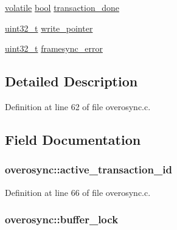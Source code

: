 \begin{DoxyCompactItemize}
\item 
\hyperlink{group___c_m_s_i_s___core___instruction_interface_gad7d93af13046b0378601b85c8c16673b}{volatile} \hyperlink{group___exported__types_gaf6a258d8f3ee5206d682d799316314b1}{bool} \hyperlink{structoverosync_a065e182f37469dcd89b3de4464d91267}{transaction\-\_\-done}
\item 
\hyperlink{stdint_8h_a435d1572bf3f880d55459d9805097f62}{uint32\-\_\-t} \hyperlink{structoverosync_a094836cef0f9cc8e8b45f8d6a58dc9ad}{write\-\_\-pointer}
\item 
\hyperlink{stdint_8h_a435d1572bf3f880d55459d9805097f62}{uint32\-\_\-t} \hyperlink{structoverosync_a628e392bbafa6a9bdac1085b68fc13bb}{framesync\-\_\-error}
\end{DoxyCompactItemize}


\subsection{Detailed Description}


Definition at line 62 of file overosync.\-c.



\subsection{Field Documentation}
\hypertarget{structoverosync_a1d7c514ddaae4ce9d2eb14242df38685}{
\subsubsection[{active\-\_\-transaction\-\_\-id}]{ overosync\-::active\-\_\-transaction\-\_\-id}}\label{structoverosync_a1d7c514ddaae4ce9d2eb14242df38685}


Definition at line 66 of file overosync.\-c.

\hypertarget{structoverosync_aa265838f8057c004fdb2e4ef40685434}{
\subsubsection[{buffer\-\_\-lock}]{ overosync\-::buffer\-\_\-lock}}\label{structoverosync_aa265838f8057c004fdb2e4ef40685434}


